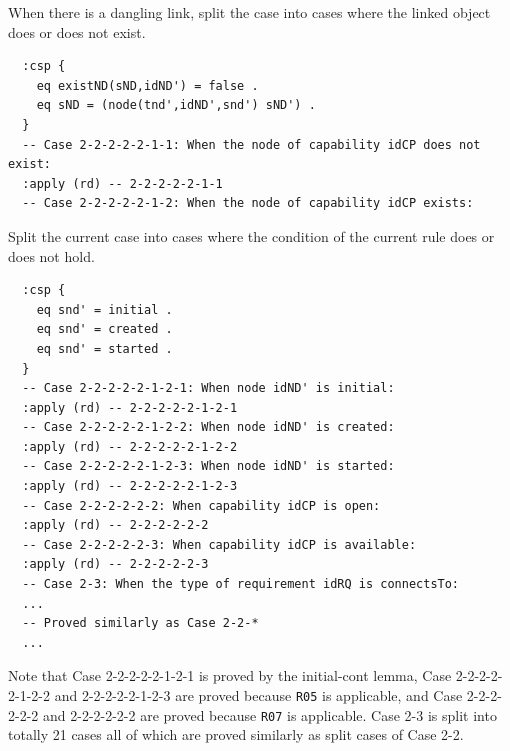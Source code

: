\documentclass[12pt]{report}
\begin{document}
 When there is a dangling link, split the case
into cases where the linked object does or does not exist.
\small
\begin{verbatim}
  :csp {
    eq existND(sND,idND') = false .
    eq sND = (node(tnd',idND',snd') sND') .
  }
  -- Case 2-2-2-2-2-1-1: When the node of capability idCP does not exist:
  :apply (rd) -- 2-2-2-2-2-1-1
  -- Case 2-2-2-2-2-1-2: When the node of capability idCP exists:
\end{verbatim}
\normalsize
 Split the current case into cases where
the condition of the current rule does or does not hold.
\small
\begin{verbatim}
  :csp {
    eq snd' = initial .
    eq snd' = created .
    eq snd' = started .
  }
  -- Case 2-2-2-2-2-1-2-1: When node idND' is initial:
  :apply (rd) -- 2-2-2-2-2-1-2-1
  -- Case 2-2-2-2-2-1-2-2: When node idND' is created:
  :apply (rd) -- 2-2-2-2-2-1-2-2
  -- Case 2-2-2-2-2-1-2-3: When node idND' is started:
  :apply (rd) -- 2-2-2-2-2-1-2-3
  -- Case 2-2-2-2-2-2: When capability idCP is open:
  :apply (rd) -- 2-2-2-2-2-2
  -- Case 2-2-2-2-2-3: When capability idCP is available:
  :apply (rd) -- 2-2-2-2-2-3
  -- Case 2-3: When the type of requirement idRQ is connectsTo:
  ...
  -- Proved similarly as Case 2-2-*
  ...
\end{verbatim}
\normalsize
Note that Case 2-2-2-2-2-1-2-1 is proved by the initial-cont lemma,
Case 2-2-2-2-2-1-2-2 and 2-2-2-2-2-1-2-3 are proved because {\tt R05}
is applicable, and Case 2-2-2-2-2-2 and 2-2-2-2-2-2 are proved because
{\tt R07} is applicable.  Case 2-3 is split into totally 21 cases all
of which are proved similarly as split cases of Case 2-2.
\end{document}
